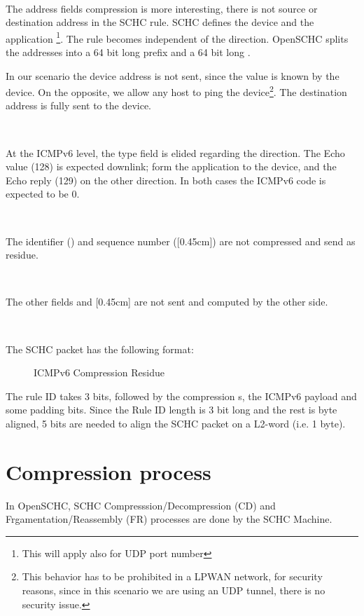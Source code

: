 ~

The address fields compression is more interesting, there is not source or destination address in the SCHC rule. SCHC defines the device  and the application \footnote{This will apply also for UDP port number}. The rule becomes independent of the direction. OpenSCHC splits the addresses into a 64 bit long prefix and a 64 bit long . 

In our scenario the device address is not sent, since the value is known by the device. On the opposite, we allow any host to ping the device\footnote{This behavior has to be prohibited in a LPWAN network, for security reasons, since in this scenario we are using an UDP tunnel, there is no security issue.}. The destination address is fully sent to the device.

~~

At the ICMPv6 level, the type field is elided regarding the direction. The Echo value (128) is expected downlink; form the application to the device, and the Echo reply (129) on the other direction. In both cases the ICMPv6 code is expected to be 0.

~~~

The identifier () and sequence number ([0.45cm]) are not compressed and send as residue.

~~

The other fields  and [0.45cm] are not sent and computed by the other side.

~~

The SCHC packet has the following format:

\begin{figure}[!ht] 
\centering 

\caption{ICMPv6 Compression Residue} 
\label{fig-residue} 
\end{figure} 

The rule ID takes 3 bits, followed by the compression s, the ICMPv6 payload and some padding bits. Since the Rule ID length is 3 bit long and the rest is byte aligned, 5 bits are needed to align the SCHC packet on a  L2-word (i.e. 1 byte).

\section {Compression process}

In OpenSCHC, SCHC Compresssion/Decompression (CD) and Frgamentation/Reassembly (FR) processes are done by the SCHC Machine.

